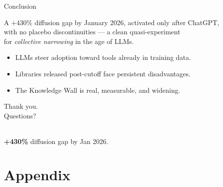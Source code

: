 \documentclass[10pt, aspectratio=169]{beamer}
\begin{document}
\begin{frame}{Conclusion}
    \begin{alertblock}{}
        \centering \Large
        A $+430\%$ diffusion gap by January 2026, activated only after ChatGPT,
        \\
        with no placebo discontinuities --- a clean quasi-experiment
        \\
        for \emph{collective narrowing} in the age of LLMs.
    \end{alertblock}
    \vfill
    \begin{itemize}
        \item LLMs steer adoption toward tools already in training data.
        \item Libraries released post-cutoff face persistent disadvantages.
        \item The Knowledge Wall is real, measurable, and widening.
    \end{itemize}
\end{frame}

\begin{frame}[standout]{}
    \centering
    {\Huge Thank you.}\\[1em]
    {\Large Questions?}\\[2em]
    \\[1em]
    {\Large \textbf{+430\%} diffusion gap by Jan 2026.}
\end{frame}

\appendix
\section*{Appendix}
\end{document}
